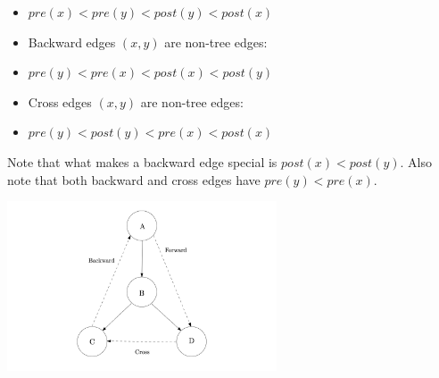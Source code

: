 \begin{itemize}
\begin{itemize}
        \item[] $pre(x) < pre(y) < post(y) < post(x)$
        \item Backward edges $(x, y)$ are non-tree edges:
        \item[] $pre(y) < pre(x) < post(x) < post(y)$
        \item Cross edges $(x, y)$ are non-tree edges:
        \item[] $pre(y) < post(y) < pre(x) < post(x)$
    \end{itemize}
    \item Note that what makes a backward edge special is $post(x) < post(y)$. Also note that both backward and cross edges have $pre(y) < pre(x)$.
    \begin{center}
        \item[] \includegraphics[width=0.6\textwidth]{lecture17/images/types-of edges.jpg}
    \end{center}
\end{itemize}

